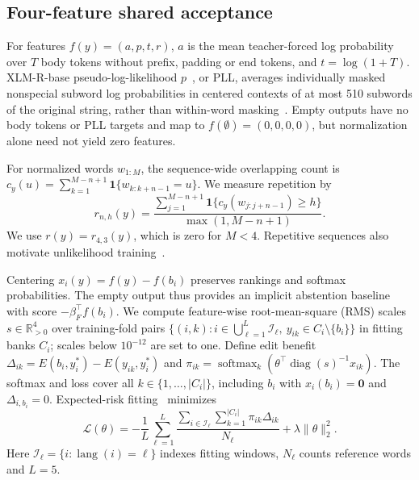 \documentclass[conference,letterpaper]{IEEEtran}
\begin{document}
\subsection{Four-feature shared acceptance}
For features $f(y)=(a,p,t,r)$, $a$ is the mean teacher-forced log probability over $T$ body tokens without prefix, padding or end tokens, and $t=\log(1+T)$. XLM-R-base pseudo-log-likelihood $p$~\cite{xlmr,mlmscoring}, or PLL, averages individually masked nonspecial subword log probabilities in centered contexts of at most 510 subwords of the original string, rather than within-word masking~\cite{kauf2023}. Empty outputs have no body tokens or PLL targets and map to $f(\emptyset)=(0,0,0,0)$, but normalization alone need not yield zero features.

For normalized words $w_{1:M}$, the sequence-wide overlapping count is $c_y(u)=\sum_{k=1}^{M-n+1}\mathbf1\{w_{k:k+n-1}=u\}$. We measure repetition by
\begin{equation}
r_{n,h}(y)=\frac{\sum_{j=1}^{M-n+1}\mathbf1\{c_y(w_{j:j+n-1})\ge h\}}{\max(1,M-n+1)}.
\label{eq:repetition}
\end{equation}
We use $r(y)=r_{4,3}(y)$, which is zero for $M<4$. Repetitive sequences also motivate unlikelihood training~\cite{welleck2020}.

Centering $x_i(y)=f(y)-f(b_i)$ preserves rankings and softmax probabilities.
The empty output thus provides an implicit abstention baseline with score $-\beta_F^\top f(b_i)$. We compute feature-wise root-mean-square (RMS) scales $s\in\mathbb R^4_{>0}$ over training-fold pairs $\{(i,k):i\in\bigcup_{\ell=1}^L\mathcal I_\ell,\ y_{ik}\in C_i\setminus\{b_i\}\}$ in fitting banks $C_i$; scales below $10^{-12}$ are set to one. Define edit benefit $\Delta_{ik}=E(b_i,y_i^*)-E(y_{ik},y_i^*)$ and $\pi_{ik}=\operatorname{softmax}_k\!\left(\theta^\top\operatorname{diag}(s)^{-1}x_{ik}\right)$. The softmax and loss cover all $k\in\{1,\ldots,|C_i|\}$, including $b_i$ with $x_i(b_i)=\mathbf0$ and $\Delta_{i,b_i}=0$. Expected-risk fitting~\cite{mwer2018} minimizes
\begin{equation}
\mathcal L(\theta)=-\frac1L\sum_{\ell=1}^L\frac{\sum_{i\in\mathcal I_\ell}\sum_{k=1}^{|C_i|}\pi_{ik}\Delta_{ik}}{N_\ell}+\lambda\|\theta\|_2^2.
\label{eq:risk}
\end{equation}
Here $\mathcal I_\ell=\{i:\operatorname{lang}(i)=\ell\}$ indexes fitting windows, $N_\ell$ counts reference words and $L=5$.
\end{document}
